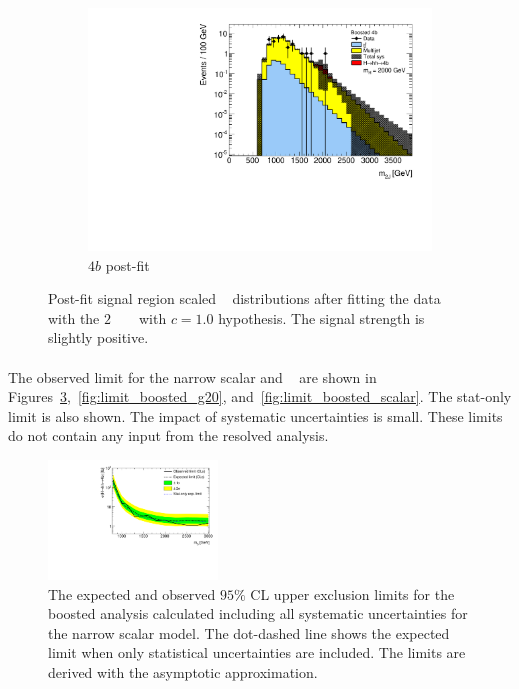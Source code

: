 \begin{figure}[htb!]
    \begin{subfigure}[b]{0.33\textwidth}
        \includegraphics[width=\textwidth,angle=-90]{figures/boosted/results/postfitplot_s_2000_b4b.pdf}
        \caption{$4b$ post-fit}
        \label{fig:postfit4b}
    \end{subfigure}
\caption{Post-fit signal region scaled \mtwoJ~ distributions after fitting the data with the $2$ \TeV~ \Grav~ with $c=1.0$ hypothesis. The signal strength is slightly positive.}
\label{fig:postfit2000}
\end{figure}

\paragraph{}
The observed limit for the narrow scalar and \Grav~ are shown in Figures~\ref{fig:limit_boosted_g10},~\ref{fig:limit_boosted_g20}, and~\ref{fig:limit_boosted_scalar}.
The stat-only limit is also shown. The impact of systematic uncertainties is small. 
These limits do not contain any input from the resolved analysis.

\begin{figure}
\begin{center}
\includegraphics[width=0.4\textwidth,angle=-90]{figures/boosted/results/limit_boosted_boosted_okt18_s.pdf}
\caption{The expected and observed $95\%$ CL upper exclusion limits for the boosted analysis calculated including all systematic uncertainties for the narrow scalar model. The dot-dashed line shows the expected limit when only statistical uncertainties are included. The limits are derived with the asymptotic approximation.}
\label{fig:limit_boosted_g10}
\end{center}
\end{figure}

